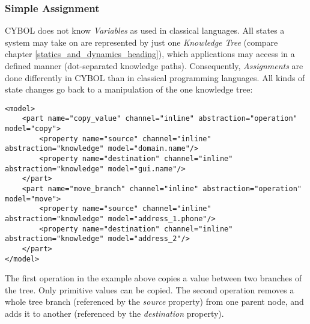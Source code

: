 %
%
%
%
%
%
%

\subsubsection{Simple Assignment}
\label{simple_assignment_heading}

CYBOL does not know \emph{Variables} as used in classical languages. All states
a system may take on are represented by just one \emph{Knowledge Tree} (compare
chapter \ref{statics_and_dynamics_heading}), which applications may access in a
defined manner (dot-separated knowledge paths). Consequently, \emph{Assignments}
are done differently in CYBOL than in classical programming languages. All
kinds of state changes go back to a manipulation of the one knowledge tree:

\begin{scriptsize}
    \begin{verbatim}
<model>
    <part name="copy_value" channel="inline" abstraction="operation" model="copy">
        <property name="source" channel="inline" abstraction="knowledge" model="domain.name"/>
        <property name="destination" channel="inline" abstraction="knowledge" model="gui.name"/>
    </part>
    <part name="move_branch" channel="inline" abstraction="operation" model="move">
        <property name="source" channel="inline" abstraction="knowledge" model="address_1.phone"/>
        <property name="destination" channel="inline" abstraction="knowledge" model="address_2"/>
    </part>
</model>
    \end{verbatim}
\end{scriptsize}

The first operation in the example above copies a value between two branches of
the tree. Only primitive values can be copied. The second operation removes a
whole tree branch (referenced by the \emph{source} property) from one parent
node, and adds it to another (referenced by the \emph{destination} property).
